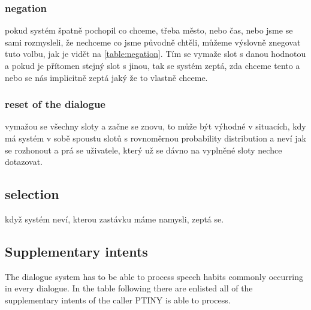 \subsubsection{negation}

pokud systém špatně pochopil co chceme, třeba město, nebo čas, nebo jsme se sami rozmysleli, že nechceme co jsme původně chtěli, můžeme výslovně znegovat tuto volbu, jak je vidět na \ref{table:negation}. Tím se vymaže slot s danou hodnotou a pokud je přítomen stejný slot s jinou, tak se systém zeptá, zda chceme tento a nebo se nás implicitně zeptá jaký že to vlastně chceme.

\subsubsection{reset of the dialogue}

vymažou se všechny sloty a začne se znovu, to může být výhodné v situacích, kdy má systém v sobě spoustu slotů s rovnoměrnou probability distribution a neví jak se rozhonout a prá se uživatele, který už se dávno na vyplněné sloty nechce dotazovat.

\subsection{selection}

když systém neví, kterou zastávku máme namysli, zeptá se.




\subsection{Supplementary intents} %

The dialogue system has to be able to process speech habits commonly occurring in every dialogue.
In the table following there are enlisted all of the supplementary intents of the caller PTINY is able to process.

